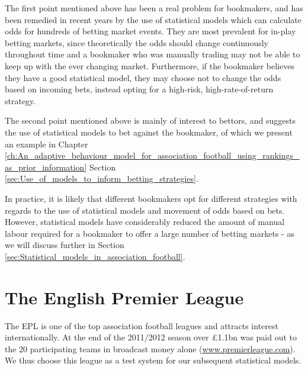 The first point mentioned above has been a real problem for bookmakers, and has been remedied in recent years by the use
of statistical models which can calculate odds for hundreds of betting market events. They are most prevalent for
in-play betting markets, since theoretically the odds should change continuously throughout time and a bookmaker who was
manually trading may not be able to keep up with the ever changing market. Furthermore, if the bookmaker believes they
have a good statistical model, they may choose not to change the odds based on incoming bets, instead opting for a
high-risk, high-rate-of-return strategy.

The second point mentioned above is mainly of interest to bettors, and suggests the use of statistical models to bet
against the bookmaker, of which we present an example in Chapter
\ref{ch:An_adaptive_behaviour_model_for_association_football_using_rankings_as_prior_information} Section
\ref{sec:Use_of_models_to_inform_betting_strategies}.

In practice, it is likely that different bookmakers opt for different strategies with regards to the use of statistical
models and movement of odds based on bets. However, statistical models have considerably reduced the amount of manual
labour required for a bookmaker to offer a large number of betting markets - as we will discuss further in Section
\ref{sec:Statistical_models_in_association_football}.


\section{The English Premier League}
\label{sec:The_English_Premier_League}
 
The \gls{EPL} is one of the top association football leagues and attracts interest internationally. At the end of the
2011/2012 season over \pounds1.1bn was paid out to the 20 participating teams in broadcast money alone
(\url{www.premierleague.com}). We thus choose this league as a test system for our subsequent statistical models.

